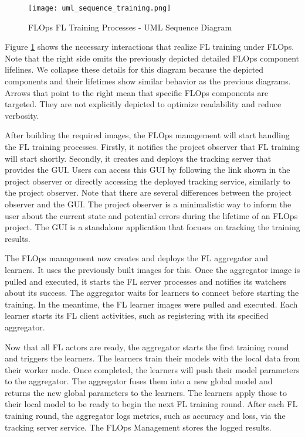 \begin{figure}[h]
    \begin{adjustwidth}{-0.2\paperwidth}{-0.2\paperwidth}
        \centering
        \texttt{[image: uml\_sequence\_training.png]}
        \caption{FLOps FL Training Processes - UML Sequence Diagram}
        \label{fig:uml_sequence_training}
    \end{adjustwidth}
\end{figure}

Figure \ref{fig:uml_sequence_training} shows the necessary interactions that realize FL training under FLOps.
Note that the right side omits the previously depicted detailed FLOps component lifelines.
We collapse these details for this diagram because the depicted components and their lifetimes show similar behavior as the previous diagrams.
Arrows that point to the right mean that specific FLOps components are targeted.
They are not explicitly depicted to optimize readability and reduce verbosity.

After building the required images, the FLOps management will start handling the FL training processes.
Firstly, it notifies the project observer that FL training will start shortly.
Secondly, it creates and deploys the tracking server that provides the GUI.
Users can access this GUI by following the link shown in the project observer or directly accessing the deployed tracking service, similarly to the project observer.
Note that there are several differences between the project observer and the GUI.
The project observer is a minimalistic way to inform the user about the current state and potential errors during the lifetime of an FLOps project.
The GUI is a standalone application that focuses on tracking the training results.

The FLOps management now creates and deploys the FL aggregator and learners.
It uses the previously built images for this.
Once the aggregator image is pulled and executed, it starts the FL server processes and notifies its watchers about its success.
The aggregator waits for learners to connect before starting the training.
In the meantime, the FL learner images were pulled and executed.
Each learner starts its FL client activities, such as registering with its specified aggregator.

Now that all FL actors are ready, the aggregator starts the first training round and triggers the learners.
The learners train their models with the local data from their worker node.
Once completed, the learners will push their model parameters to the aggregator.
The aggregator fuses them into a new global model and returns the new global parameters to the learners.
The learners apply those to their local model to be ready to begin the next FL training round.
After each FL training round, the aggregator logs metrics, such as accuracy and loss, via the tracking server service.
The FLOps Management stores the logged results.

